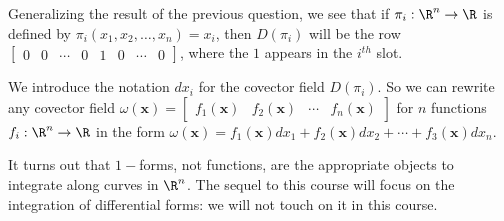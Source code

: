 \documentclass{ximera}
\begin{document}
	Generalizing the result of the previous question, we see that if $\pi_i:\R^n \to \R$ is defined by $\pi_i(x_1,x_2,\ldots,x_n) = x_i$, then $D(\pi_i)$ will
	be the row $\begin{bmatrix} 0&0& \cdots &0&1&0& \cdots &0\end{bmatrix}$, where the $1$ appears in the $i^{th}$ slot.
	
	We introduce the notation $dx_i$ for the covector field $D(\pi_i)$.  So we can rewrite any covector field 
	$\omega(\mathbf{x}) = \begin{bmatrix} f_1(\mathbf{x}) &  f_2(\mathbf{x}) & \cdots &  f_n(\mathbf{x})  \end{bmatrix}$ for $n$ functions $f_i:\R^n \to \R$
	in the form $\omega(\mathbf{x}) = f_1(\mathbf{x})dx_1+f_2(\mathbf{x})dx_2+ \cdots +f_3(\mathbf{x})dx_n$.
	
	It turns out that $1-$forms, not functions, are the appropriate objects to integrate along curves in $\R^n$. 
	The sequel to this course will focus on the integration of differential forms:  we will not touch on it in this course.
\end{document}

